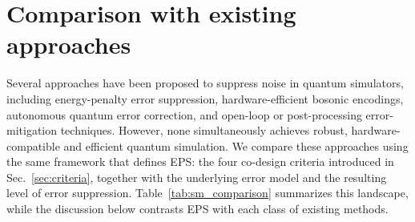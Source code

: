 \documentclass[%
10pt,tightenlines,
superscriptaddress,
 amsmath,amssymb,
 aps,
pra,
]{revtex4-2}
\begin{document}
\section{Comparison with existing approaches}\label{sm:comparison}
Several approaches have been proposed to suppress noise in quantum simulators, including energy-penalty error suppression, hardware-efficient bosonic encodings, autonomous quantum error correction, and open-loop or post-processing error-mitigation techniques. However, none simultaneously achieves robust, hardware-compatible and efficient quantum simulation. We compare these approaches using the same framework that defines EPS: the four co-design criteria introduced in Sec.~\ref{sec:criteria}, together with the underlying error model and the resulting level of error suppression. Table~\ref{tab:sm_comparison} summarizes this landscape, while the discussion below contrasts EPS with each class of existing methods.
\end{document}
